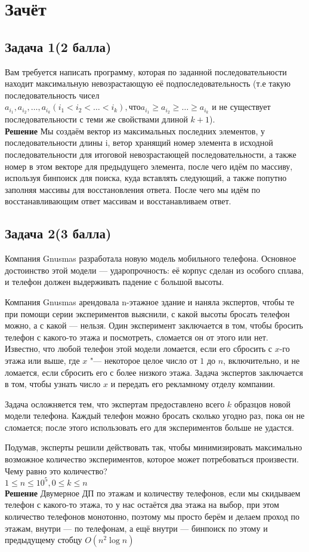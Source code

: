 \documentclass[a4paper, 12pt]{article}
\theoremstyle{plain}
\theoremstyle{definition}
\theoremstyle{remark}
\begin{document}
\section{Зачёт}
\subsection{Задача 1(2 балла)}
Вам требуется написать программу, которая по заданной последовательности находит максимальную невозрастающую её подпоследовательность (т.е такую последовательность чисел $a_{i_1},a_{i_2},\dots,a_{i_k} (i_1<i_2<\dots<i_k), что a_{i_1}\geq a_{i_2}\geq\dots\geq a_{i_k}$ и не существует последовательности с теми же свойствами длиной $k+1$).\\
\textbf{Решение} Мы создаём вектор из максимальных последних элементов, у последовательности
длины i, ветор хранящий номер элемента в исходной последовательности для
итоговой невозрастающей последовательности, а также номер в этом векторе для
предыдущего элемента, после чего идём по массиву, используя бинпоиск для
поиска, куда вставлять следующий, а также попутно заполняя массивы для
восстановления ответа. После чего мы идём по восстанавливающим ответ массивам и
восстанавливаем ответ.
\subsection{Задача 2(3 балла)}
Компания Gnusmas разработала новую модель мобильного телефона. Основное достоинство этой модели — ударопрочность: её корпус сделан из особого сплава, и телефон должен выдерживать падение с большой высоты.

Компания Gnusmas арендовала n-этажное здание и наняла экспертов, чтобы те при помощи серии экспериментов выяснили, с какой высоты бросать телефон можно, а с какой — нельзя. Один эксперимент заключается в том, чтобы бросить телефон с какого-то этажа и посмотреть, сломается он от этого или нет. Известно, что любой телефон этой модели ломается, если его сбросить с $x$-го этажа или выше, где $x$ "--- некоторое целое число от $1$ до $n$, включительно, и не ломается, если сбросить его с более низкого этажа. Задача экспертов заключается в том, чтобы узнать число $x$ и передать его рекламному отделу компании.

Задача осложняется тем, что экспертам предоставлено всего $k$ образцов новой модели телефона. Каждый телефон можно бросать сколько угодно раз, пока он не сломается; после этого использовать его для экспериментов больше не удастся.

Подумав, эксперты решили действовать так, чтобы минимизировать максимально возможное количество экспериментов, которое может потребоваться произвести. Чему равно это количество?\\
$1\leq n\leq 10^5, 0\leq k\leq n$\\
\textbf{Решение} Двумерное ДП по этажам и количеству телефонов, если мы скидываем телефон с какого-то этажа, то у нас остаётся два этажа на выбор, при этом количество телефонов монотонно, поэтому мы просто берём и делаем проход по этажам, внутри --- по телефонам, а ещё внутри --- бинпоиск по этому и предыдущему стобцу $O(n^2\log n)$
\end{document}
